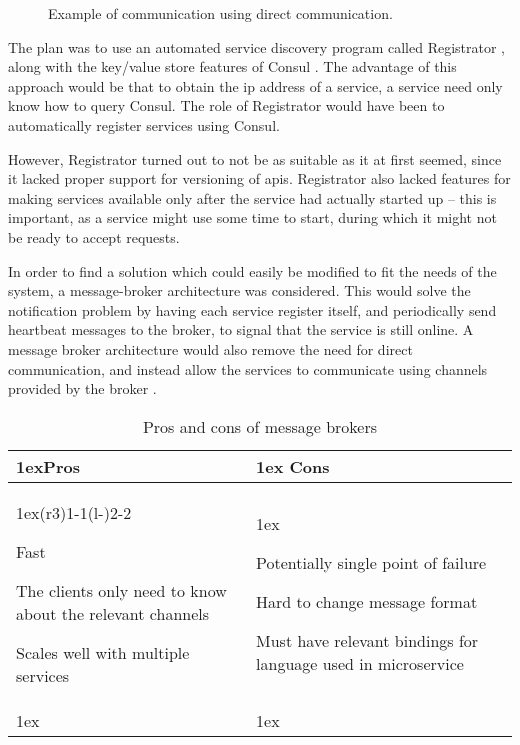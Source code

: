 \begin{figure}[H]
    \centering
    \scalebox{1.4}{}
    \caption{Example of communication using direct communication.}
    \label{fig:alternativeDirectComm}
\end{figure}

The plan was to use an automated service discovery program called Registrator \citep{registrator}, along with the key/value store features of Consul \citep{consulMicroservice}. The advantage of this approach would be that to obtain the \acrshort{ip} address of a service, a service need only know how to query Consul. The role of Registrator would have been to automatically register services using Consul.

However, Registrator turned out to not be as suitable as it at first seemed, since it lacked proper support for versioning of \acrshort{api}s. 
Registrator also lacked features for making services available only after the service had actually started up -- this is important, as a service might use some time to start, during which it might not be ready to accept requests.

In order to find a solution which could easily be modified to fit the needs of the system, a message-broker architecture was considered. This would solve the notification problem by having each service register itself, and periodically send heartbeat messages to the broker, to signal that the service is still online.
A message broker architecture would also remove the need for direct communication, and instead allow the services to communicate using channels provided by the broker \citep{nginxMicroservicesMessageBroker}.

\begin{table}[H]
\caption{Pros and cons of message brokers}
\begin{tabularx}{\linewidth}{>{\parskip1ex}X@{\kern4\tabcolsep}>{\parskip1ex}X}
\toprule
\hfil\bfseries Pros
&
\hfil\bfseries Cons\\
\cmidrule(r{3\tabcolsep}){1-1}\cmidrule(l{-\tabcolsep}){2-2}

Fast\par
The clients only need to know about the relevant channels\par
Scales well with multiple services\par

&

Potentially single point of failure\par
Hard to change message format\par
Must have relevant bindings for language used in microservice\par
\\\\\end{tabularx}
\label{table:pros_cons_broker}
\end{table}


